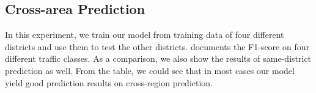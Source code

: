 %

\subsection{Cross-area Prediction}
In this experiment, we train our model from training data of
four different districts and use them to test the other districts.
 documents the F1-score on four different traffic
classes. As a comparison, we also show the results of
same-district prediction as well. From the table, we could see that in most cases our model yield good prediction results on cross-region prediction. 

